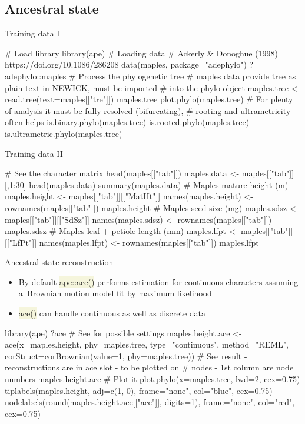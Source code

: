 \documentclass[compress, ucs, xelatex, 11pt, xcolor=svgnames, aspectratio=169,
	hyperref={
		bookmarks=true,
		unicode=true,
		colorlinks=true,
		pdftitle={Molecular data in R},
		plainpages=false,
		pdfauthor={Vojtech Zeisek},
		pdfsubject={Course about phylogeny and evolution in R},
		pdfcreator={XeLaTeX},
		pdfkeywords={R, evolution, phylogeny, molecular data},
		linkcolor=Crimson, %
		anchorcolor=Magenta, %
		citecolor=Magenta, %
		filecolor=Magenta, %
		menucolor=Magenta, %
		urlcolor=DodgerBlue, %
		pdftex},
	url={hyphens, lowtilde} %
	]{beamer}
\renewcommand{\texttt}[1]{\colorbox{Beige}{{\ttfamily #1}}}
\begin{document}
\subsection{Ancestral state}

\begin{frame}[fragile]{Training data I}
	\begin{spluscode}
    # Load library
    library(ape)
    # Loading data
    # Ackerly & Donoghue (1998) https://doi.org/10.1086/286208
    data(maples, package="adephylo")
    ?adephylo::maples
    # Process the phylogenetic tree
    # maples data provide tree as plain text in NEWICK, must be imported
    # into the phylo object
    maples.tree <- read.tree(text=maples[["tre"]])
    maples.tree
    plot.phylo(maples.tree)
    # For plenty of analysis it must be fully resolved (bifurcating),
    # rooting and ultrametricity often helps
    is.binary.phylo(maples.tree)
    is.rooted.phylo(maples.tree)
    is.ultrametric.phylo(maples.tree)
	\end{spluscode}
\end{frame}

\begin{frame}[fragile]{Training data II}
	\begin{spluscode}
    # See the character matrix
    head(maples[["tab"]])
    maples.data <- maples[["tab"]][,1:30]
    head(maples.data)
    summary(maples.data)
    # Maples mature height (m)
    maples.height <- maples[["tab"]][["MatHt"]]
    names(maples.height) <- rownames(maples[["tab"]])
    maples.height
    # Maples seed size (mg)
    maples.sdsz  <- maples[["tab"]][["SdSz"]]
    names(maples.sdsz) <- rownames(maples[["tab"]])
    maples.sdsz
    # Maples leaf + petiole length (mm)
    maples.lfpt <- maples[["tab"]][["LfPt"]]
    names(maples.lfpt) <- rownames(maples[["tab"]])
    maples.lfpt
	\end{spluscode}
\end{frame}

\begin{frame}[fragile]{Ancestral state reconstruction}
	\begin{itemize}
		\item By default \texttt{ape::ace()} performs estimation for continuous characters assuming a~Brownian motion model fit by maximum likelihood
		\item \texttt{ace()} can handle continuous as well as discrete data
	\end{itemize}
	\begin{spluscode}
    library(ape)
    ?ace # See for possible settings
    maples.height.ace <- ace(x=maples.height, phy=maples.tree,
      type="continuous", method="REML", corStruct=corBrownian(value=1,
      phy=maples.tree))
    # See result - reconstructions are in ace slot - to be plotted on
    # nodes - 1st column are node numbers
    maples.height.ace
    # Plot it
    plot.phylo(x=maples.tree, lwd=2, cex=0.75)
    tiplabels(maples.height, adj=c(1, 0), frame="none", col="blue", cex=0.75)
    nodelabels(round(maples.height.ace[["ace"]], digits=1), frame="none",
      col="red", cex=0.75)
	\end{spluscode}
\end{frame}
\end{document}
